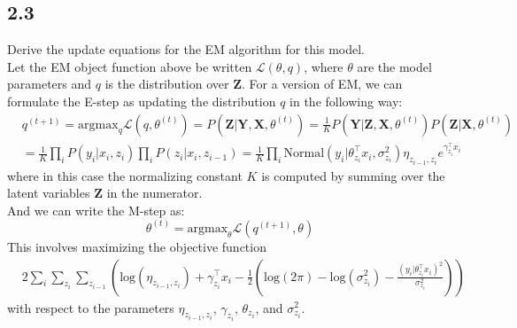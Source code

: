 \documentclass[12pt]{article}
\begin{document}

\subsection*{2.3}
Derive the update equations for the EM algorithm for this model.
\\

Let the EM object function above be written $\mathcal{L}(\theta,q)$, where $\theta$ are the model parameters and $q$ is the distribution over $\textbf{Z}$. For a version of EM, we can formulate the E-step as updating the distribution $q$ in the following way: 
\begin{equation}
    \begin{split}
        & q^{(t+1)} = \text{argmax}_q \mathcal{L}(q,\theta^{(t)}) = P(\textbf{Z} | \textbf{Y}, \textbf{X}, \theta^{(t)})
            = \frac{1}{K} P(\textbf{Y} | \textbf{Z}, \textbf{X}, \theta^{(t)}) P(\textbf{Z} | \textbf{X}, \theta^{(t)}) \\
        & = \frac{1}{K} \prod_i P(y_i | x_i, z_i) \prod_i P(z_i | x_i, z_{i-1})
            = \frac{1}{K} \prod_i \text{Normal}(y_i | \theta_{z_i}^{\top} x_i, \sigma_{z_i}^2)  
            \eta_{z_{i-1},z_i} e^{\gamma_{z_i}^{\top} x_i}
    \end{split}
\end{equation}
where in this case the normalizing constant $K$ is computed by summing over the latent variables $\textbf{Z}$ in the numerator.
\\

And we can write the M-step as:
\begin{equation}
    \theta^{(t)} = \text{argmax}_{\theta} \mathcal{L}(q^{(t+1)},\theta)
\end{equation}
This involves maximizing the objective function 
\begin{equation}
    \begin{split}
        & 2\sum_i \sum_{z_i} \sum_{z_{i-1}} \left( \text{log}(\eta_{z_{i-1},z_i}) + \gamma_{z_i}^{\top} x_i 
             -\frac{1}{2}\left( \text{log}(2\pi) - \text{log}(\sigma_{z_i}^2) - \frac{(y_i | \theta_{z_i}^{\top} x_i)^2}{ \sigma_{z_i}^2} \right)  \right)
    \end{split}
\end{equation}
with respect to the parameters $\eta_{z_{i-1},z_i}$, $\gamma_{z_i}$, $\theta_{z_i}$, and $\sigma_{z_i}^2$.
\end{document}
